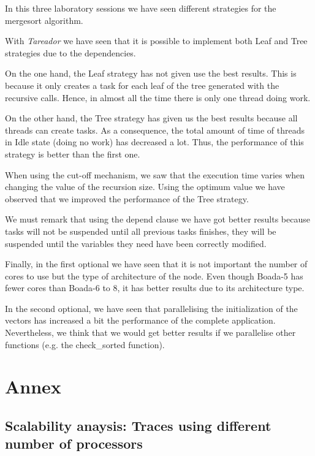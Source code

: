 \documentclass[12pt, a4paper]{article}
\begin{document}
In this three laboratory sessions we have seen different strategies for the mergesort algorithm.

With \textit{Tareador} we have seen that it is possible to implement both Leaf and Tree strategies due to the dependencies.

On the one hand, the Leaf strategy has not given use the best results. This is because it only creates a task for each leaf of the tree generated with the recursive calls. Hence, in almost all the time there is only one thread doing work.

On the other hand, the Tree strategy has given us the best results because all threads can create tasks. As a consequence, the total amount of time of threads in Idle state (doing no work) has decreased a lot. Thus, the performance of this strategy is better than the first one.

When using the cut-off mechanism, we saw that the execution time varies when changing the value of the recursion size. Using the optimum value we have observed that we improved the performance of the Tree strategy.

We must remark that using the depend clause we have got better results because tasks will not be suspended until all previous tasks finishes, they will be suspended until the variables they need have been correctly modified.

Finally, in the first optional we have seen that it is not important the number of cores to use but the type of architecture of the node. Even though Boada-5 has fewer cores than Boada-6 to 8, it has better results due to its architecture type.

In the second optional, we have seen that parallelising the initialization of the vectors has increased a bit the performance of the complete application. Nevertheless, we think that we would get better results if we parallelise other functions (e.g. the check\_sorted function).

\newpage

\section{Annex}

\subsection{Scalability anaysis: Traces using different number of processors}
\label{ann:scalabilityS1}
\end{document}
